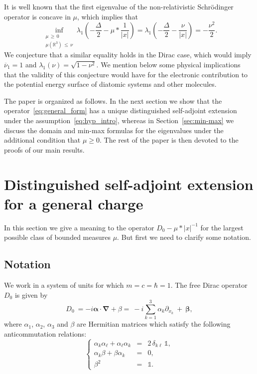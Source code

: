 \documentclass[AHL,Unicode,published]{cedram}
\newcommand{\R}{\mathbb{R}}
\newcommand{\bfbeta}{\boldsymbol{\beta}}
\newcommand{\bfalpha}{\boldsymbol{\alpha}}
\newcommand{\bfnabla}{\boldsymbol{\nabla}}
\newcommand\1{{\ensuremath {\mathds 1} }}
\renewcommand{\geq}{\geqslant}
\renewcommand{\leq}{\leqslant}
\begin{document}
It is well known that the first eigenvalue of the non-relativistic Schrödinger operator is concave in $\mu$, which implies that
\[
\inf_{\substack{\mu\,\geq\,0\\
\mu\left(\R^3\right)\,\leq\,\nu}}\lambda_1\left(-\frac\Delta2-\mu\ast\frac1{|x|}\right)=\lambda_1\left(-\frac\Delta2-\frac\nu{|x|}\right)=-\frac{\nu^2}{2}.
\]
We conjecture that a similar equality holds in the Dirac case, which would imply $\overline\nu_1=1$ and $\lambda_1(\nu)=\sqrt{1-\nu^2}$. We mention below some physical implications that the validity of this conjecture would have for the electronic contribution to the potential energy surface of diatomic systems and other molecules.


The paper is organized as follows. In the next section we show that the operator~\eqref{eq:general_form} has a unique distinguished self-adjoint extension under the assumption~\eqref{eq:hyp_intro}, whereas in Section~\ref{sec:min-max} we discuss the domain and min-max formulas for the eigenvalues under the additional condition that $\mu\geq0$. The rest of the paper is then devoted to the proofs of our main results.


\section{Distinguished self-adjoint extension for a general charge}\label{sec:self-adjointness}

In this section we give a meaning to the operator $D_0-\mu\ast|x|^{-1}$ for the largest possible class of bounded measures $\mu$. But first we need to clarify some notation.

\subsection{Notation}
We work in a system of units for which $m=c=\hbar=1$. The free Dirac operator $D_0$ is given by
\begin{equation}\label{eq:def_Dirac}
D_0\ = -i\bfalpha\cdot\bfnabla + \beta = \ - i\sum^3_{k=1} \alpha_k \partial_{x_k} \ + \ \bfbeta,
\end{equation}
where $\alpha_1$, $\alpha_2$, $\alpha_3$ and $\beta$ are Hermitian matrices which satisfy the following anticommutation relations:
\begin{equation}\label{CAR}
\left\lbrace
\begin{array}{rcl}
{\alpha}_k {\alpha}_\ell + {\alpha}_\ell {\alpha}_k & = & 2\,\delta_{k\ell}\,\1,\\
{\alpha}_k {\beta} + {\beta} {\alpha}_k & = & 0,\\
\beta^2 & = & \1.
\end{array} \right.
\end{equation}
\end{document}
